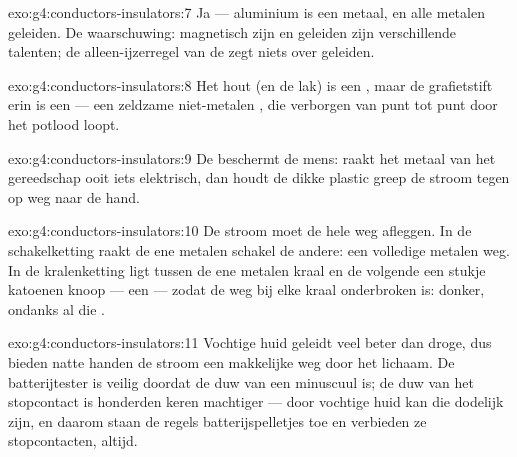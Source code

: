 \begin{solution}{exo:g4:conductors-insulators:7}
Ja --- aluminium is een metaal, en alle metalen geleiden. De
waarschuwing: magnetisch zijn en geleiden zijn verschillende talenten;
de alleen-ijzerregel van de  zegt niets over geleiden.
\end{solution}

\begin{solution}{exo:g4:conductors-insulators:8}
Het hout (en de lak) is een , maar de grafietstift erin is een
 --- een zeldzame niet-metalen , die verborgen van
punt tot punt door het potlood loopt.
\end{solution}

\begin{solution}{exo:g4:conductors-insulators:9}
De  beschermt de mens: raakt het metaal van het gereedschap
ooit iets elektrisch, dan houdt de dikke plastic greep de stroom tegen
op weg naar de hand.
\end{solution}

\begin{solution}{exo:g4:conductors-insulators:10}
De stroom moet de hele weg afleggen. In de schakelketting raakt de ene
metalen schakel de andere: een volledige metalen weg. In de
kralenketting ligt tussen de ene metalen kraal en de volgende een
stukje katoenen knoop --- een  --- zodat de weg bij elke kraal
onderbroken is: donker, ondanks al die .
\end{solution}

\begin{solution}{exo:g4:conductors-insulators:11}
Vochtige huid geleidt veel beter dan droge, dus bieden natte handen de
stroom een makkelijke weg door het lichaam. De batterijtester is
veilig doordat de duw van een  minuscuul is; de duw van het
stopcontact is honderden keren machtiger --- door vochtige huid kan
die dodelijk zijn, en daarom staan de regels batterijspelletjes toe en
verbieden ze stopcontacten, altijd.
\end{solution}
